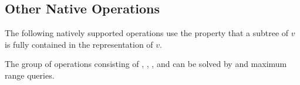 \begin{algorithm}
\begin{algorithmic}
	\State {}
\EndFunction
\end{algorithmic}
\end{algorithm}

\begin{algorithm}
\begin{algorithmic}
	\State {}
\EndFunction
\end{algorithmic}
\end{algorithm}

\subsection{Other Native Operations}\label{ss:bp-other}

The following natively supported operations use the property that a subtree of $v$ is fully contained in the representation of $v$.

\begin{algorithm}
\begin{algorithmic}
	\State {}
\EndFunction
\end{algorithmic}
\end{algorithm}

\begin{algorithm}
\begin{algorithmic}
	\State {}
\EndFunction
\end{algorithmic}
\end{algorithm}

\begin{algorithm}
\begin{algorithmic}
	\State {}
\EndFunction
\end{algorithmic}
\end{algorithm}

The group of operations consisting of \lca{}, \distance{}, \deepestVertex{}, and \hei{} can be solved by \enclose{} and maximum range queries.

\begin{algorithm}
\begin{algorithmic}
		\State {}
		\State {}
	\Else
		\State {}
	\EndIf
\EndFunction
\end{algorithmic}
\end{algorithm}

